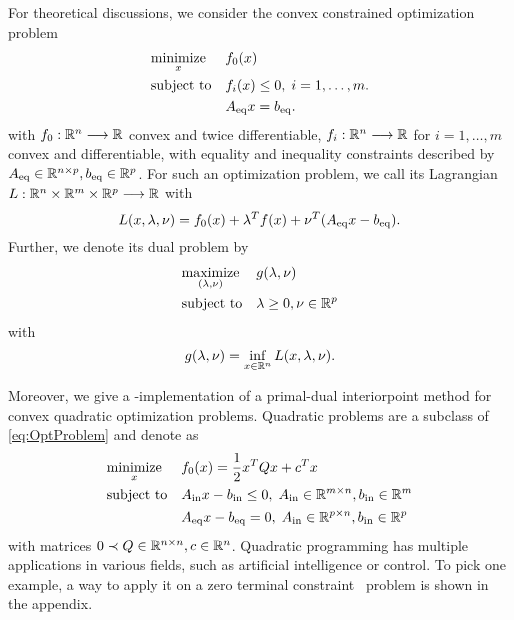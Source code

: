 For theoretical discussions, we consider the convex constrained optimization problem
\begin{equation}
\OptProblem
\label{eq:OptProblem}
\end{equation}
with $ f_0:\mathbb{R}^n \longrightarrow \mathbb{R} $ convex and twice differentiable, $ f_i:\mathbb{R}^n \longrightarrow \mathbb{R} $ for $ i=1,\dots,m $ convex and differentiable,  with equality and inequality constraints described by
$ {A}_{\mathrm{eq}} \in \mathbb{R}^{n\times p}, {b}_{\mathrm{eq}} \in  \mathbb{R}^p $. For such an optimization problem, we call its Lagrangian $ L:\mathbb{R}^n \times \mathbb{R}^m \times \mathbb{R}^p \longrightarrow \mathbb{R} $
with  \[ L(x,\lambda,\nu) = f_0(x) + \lambda^T f(x) + \nu ^T ({A}_{\mathrm{eq}} x - {b}_{\mathrm{eq}}).  \]
Further, we denote its dual problem by
\begin{equation}
	\OptProblemDual
	\label{eq:OptProblemDual}
\end{equation}
with \[ g(\lambda, \nu) = \inf_{x\in \mathbb{R}^n} L(x,\lambda,\nu). \]


Moreover, we give a \matlab-implementation of a primal-dual interiorpoint method for  convex quadratic optimization problems. Quadratic problems are a subclass of \eqref{eq:OptProblem} and denote as
\begin{equation}
	\OptProblemquad
	\label{eq:QuadProblem}
\end{equation}
with matrices $ 0 \prec Q\in \mathbb{R}^{n \times n}, c\in \mathbb{R}^n $.
Quadratic programming has multiple applications in various fields, such as artificial intelligence or control. To pick one example, a way to apply it on  a zero terminal constraint \mpclong \ problem is shown in the appendix.